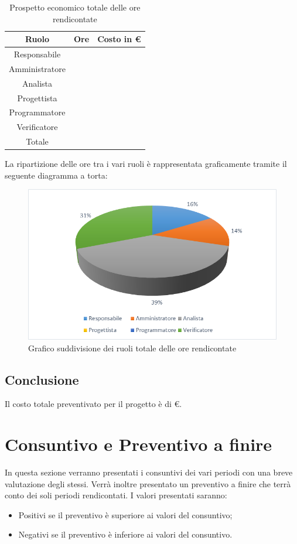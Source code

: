 \documentclass[./PianodiProgetto.tex]{subfiles}
\begin{document}
\begin{table}[H]
	\centering
	\begin{tabular}{|c|c|c|}
		\hline
		Ruolo&Ore&Costo in € \\ \hline
		Responsabile& &  \\ \hline
		Amministratore& &  \\ \hline
		Analista& &  \\ \hline
		Progettista& &  \\ \hline
		Programmatore& &  \\ \hline
		Verificatore& &  \\ \hline
		Totale& & \\ \hline
	\end{tabular}
	\caption{Prospetto economico totale delle ore rendicontate}
\end{table}

La ripartizione delle ore tra i vari ruoli è rappresentata graficamente tramite il seguente diagramma a torta:

\begin{figure}[H]
	\centering
	\includegraphics[width=1\linewidth]{img/grafici/OreRendicontateProspettoEconomico}
	\caption{Grafico suddivisione dei ruoli totale delle ore rendicontate}
	\label{fig:ore-rendicontate-prospetto-economico}
\end{figure}

\section{Conclusione}
Il costo totale preventivato per il progetto è di €.

\chapter{Consuntivo e Preventivo a finire}
In questa sezione verranno presentati i consuntivi dei vari periodi con una
breve valutazione degli stessi. Verrà inoltre presentato un preventivo a finire
che terrà conto dei soli periodi rendicontati. I valori presentati saranno:
\begin{itemize}
\item Positivi se il preventivo è superiore ai valori del consuntivo;
\item Negativi se il preventivo è inferiore ai valori del consuntivo.
\end{itemize}
\end{document}
